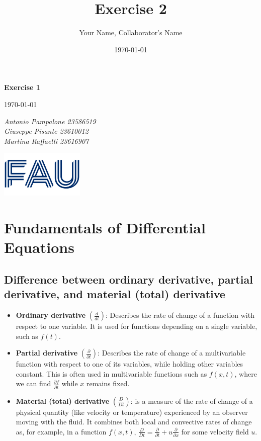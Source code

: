 \documentclass{article}
\title{Exercise 2}
\author{Your Name, Collaborator's Name}
\date{\today}
\begin{document}
\begin{titlepage}
    \centering
    \vspace*{1in}
    
    {\Huge\bfseries Exercise 1\par}
    \vspace{1.5cm}
    {\Large \today\par}
    \vspace{1.5cm}
    {\Large\itshape Antonio Pampalone 23586519 \\ Giuseppe Pisante 23610012\\ Martina Raffaelli 23616907 \par}
    
    \vfill
    \includegraphics[width=0.3\textwidth]{FAU-Logo.png}\par\vspace{1cm} %
   
\end{titlepage}

\newpage
\small


\section{Fundamentals of Differential Equations}

\subsection{Difference between ordinary derivative, partial derivative, and material (total) derivative}
\begin{itemize}
    \item \textbf{Ordinary derivative} \( \left( \frac{d}{dt} \right) \): Describes the rate of change of a function with respect to one variable. It is used for functions depending on a single variable, such as \( f(t) \).
    \item \textbf{Partial derivative} \( \left( \frac{\partial}{\partial t} \right) \): Describes the rate of change of a multivariable function with respect to one of its variables, while holding other variables constant. This is often used in multivariable functions such as \( f(x, t) \), where we can find \( \frac{\partial f}{\partial t} \) while \( x \) remains fixed.
    \item \textbf{Material (total) derivative} \( \left( \frac{D}{Dt} \right) \): is a measure of the rate of change of a physical quantity (like velocity or temperature) experienced by an observer moving with the fluid. It combines both local and convective rates of change as, for example, in a function \( f(x, t) \), \( \frac{D}{Dt} = \frac{\partial}{\partial t} + u \frac{\partial}{\partial x} \) for some velocity field \( u \).
\end{itemize}
\end{document}

